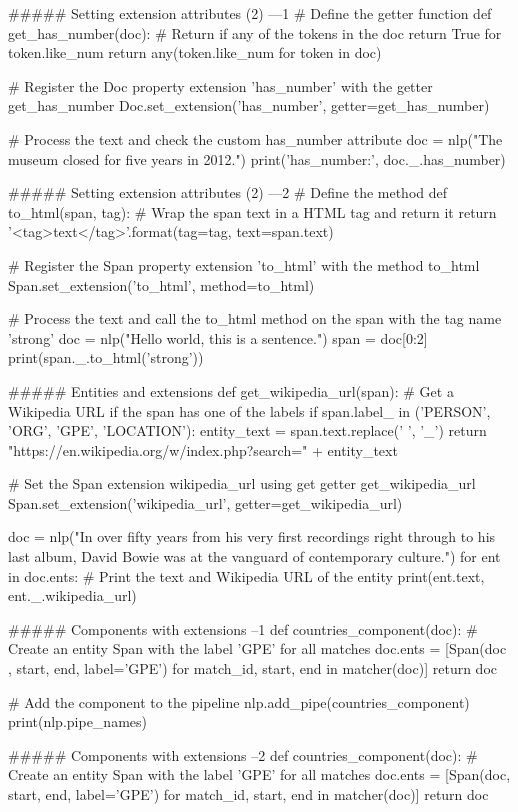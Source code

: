 ##### Setting extension attributes (2)  ---1
# Define the getter function
def get_has_number(doc):
    # Return if any of the tokens in the doc return True for token.like_num
    return any(token.like_num for token in doc)

# Register the Doc property extension 'has_number' with the getter get_has_number
Doc.set_extension('has_number', getter=get_has_number)

# Process the text and check the custom has_number attribute 
doc = nlp("The museum closed for five years in 2012.")
print('has_number:', doc._.has_number)



##### Setting extension attributes (2)  ---2
# Define the method
def to_html(span, tag):
    # Wrap the span text in a HTML tag and return it
    return '<{tag}>{text}</{tag}>'.format(tag=tag, text=span.text)

# Register the Span property extension 'to_html' with the method to_html
Span.set_extension('to_html', method=to_html)

# Process the text and call the to_html method on the span with the tag name 'strong'
doc = nlp("Hello world, this is a sentence.")
span = doc[0:2]
print(span._.to_html('strong'))


##### Entities and extensions
def get_wikipedia_url(span):
    # Get a Wikipedia URL if the span has one of the labels
    if span.label_ in ('PERSON', 'ORG', 'GPE', 'LOCATION'):
        entity_text = span.text.replace(' ', '_')
        return "https://en.wikipedia.org/w/index.php?search=" + entity_text

# Set the Span extension wikipedia_url using get getter get_wikipedia_url
Span.set_extension('wikipedia_url', getter=get_wikipedia_url)

doc = nlp("In over fifty years from his very first recordings right through to his last album, David Bowie was at the vanguard of contemporary culture.")
for ent in doc.ents:
    # Print the text and Wikipedia URL of the entity
    print(ent.text, ent._.wikipedia_url)


##### Components with extensions  --1
def countries_component(doc):
    # Create an entity Span with the label 'GPE' for all matches
    doc.ents = [Span(doc , start, end, label='GPE')
                for match_id, start, end in matcher(doc)]
    return doc

# Add the component to the pipeline
nlp.add_pipe(countries_component)
print(nlp.pipe_names)

##### Components with extensions --2
def countries_component(doc):
    # Create an entity Span with the label 'GPE' for all matches
    doc.ents = [Span(doc, start, end, label='GPE')
                for match_id, start, end in matcher(doc)]
    return doc

